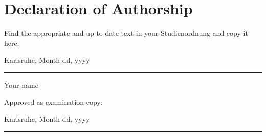 \chapter*{Declaration of Authorship}

Find the appropriate and up-to-date text in your Studienordnung and copy it here.\\

\vspace{1cm}

\noindent Karlsruhe, Month dd, yyyy \hfill \parbox[t]{.5\linewidth}{\rule[-3pt]{\linewidth}{.4pt}\par\smallskip
    \centering Your name}

\vfill

Approved as examination copy:\\

\vspace{1cm}

\noindent Karlsruhe, Month dd, yyyy \hfill \parbox[t]{.5\linewidth}{\rule[-3pt]{\linewidth}{.4pt}\par\smallskip
    \centering}

\renewcommand{\arraystretch}{1}

\cleardoublepage
